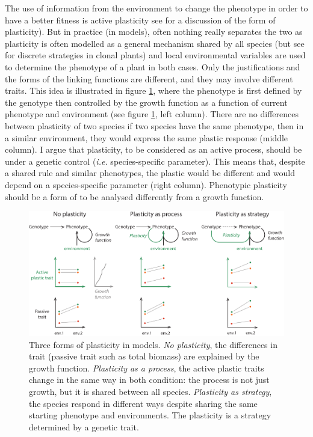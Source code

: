 The use of information from the environment to change the phenotype in order to have a better fitness is active plasticity see \cite{forsman_rethinking_2014} for a discussion of the form of plasticity). But in practice (in models)\parencite{maire_plasticity_2013}, often nothing really separates the two as plasticity is often modelled as a general mechanism shared by all species (but see \cite{jablonka_adaptive_1995} for discrete strategies in clonal plants) and local environmental variables are used to determine the phenotype of a plant in both cases. Only the justifications and the forms of the linking functions are different, and they may involve different traits. This idea is illustrated in figure \ref{fig:plastic_function}, where the phenotype is first defined by the genotype then controlled by the growth function as a function of current phenotype and environment (see figure \ref{fig:plastic_function}, left column). There are no differences between plasticity of two species if two species have the same phenotype, then in a similar environment, they would express the same plastic response (middle column). I argue that plasticity, to be considered as an active process, should be under a genetic control (\textit{i.e.} species-specific parameter). This means that, despite a shared rule and similar phenotypes, the plastic would be different and would depend on a species-specific parameter (right column). Phenotypic plasticity should be a form of  to be analysed differently from a growth function.


\begin{figure}
    \includegraphics[width=1\linewidth]{./1_Introduction/graphics/plastic_function.pdf}
  \caption[Forms of plasticity in models]{Three forms of plasticity in models. \textit{No plasticity}, the differences in trait (passive trait such as total biomass) are explained by the growth function. \textit{Plasticity as a process}, the active plastic traits change in the same way in both condition: the process is not just growth, but it is shared between all species. \textit{Plasticity as strategy}, the species respond in different ways despite sharing the same starting phenotype and environments. The plasticity is a strategy determined by a genetic trait.}
  \label{fig:plastic_function}
\end{figure}

